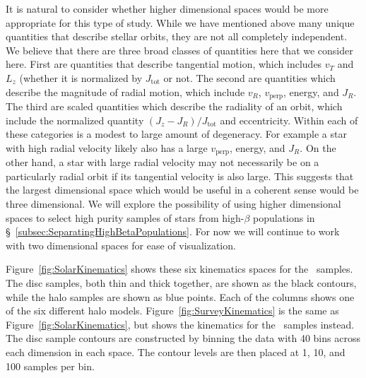 It is natural to consider whether higher dimensional spaces would be more appropriate for this type of study. While we have mentioned above many unique quantities that describe stellar orbits, they are not all completely independent. We believe that there are three broad classes of quantities here that we consider here. First are quantities that describe tangential motion, which includes $v_{T}$ and $L_{z}$ (whether it is normalized by $J_\mathrm{tot}$ or not. The second are quantities which describe the magnitude of radial motion, which include $v_{R}$, $v_\mathrm{perp}$, energy, and $J_{R}$. The third are scaled quantities which describe the radiality of an orbit, which include the normalized quantity $(J_{z}-J_{R})/J_\mathrm{tot}$ and eccentricity. Within each of these categories is a modest to large amount of degeneracy. For example a star with high radial velocity likely also has a large $v_\mathrm{perp}$, energy, and $J_{R}$. On the other hand, a star with large radial velocity may not necessarily be on a particularly radial orbit if its tangential velocity is also large. This suggests that the largest dimensional space which would be useful in a coherent sense would be three dimensional. We will explore the possibility of using higher dimensional spaces to select high purity samples of stars from high-$\beta$ populations in \S~\ref{subsec:SeparatingHighBetaPopulations}. For now we will continue to work with two dimensional spaces for ease of visualization.


Figure~\ref{fig:SolarKinematics} shows these six kinematics spaces for the \solar\ samples. The disc samples, both thin and thick together, are shown as the black contours, while the halo samples are shown as blue points. Each of the columns shows one of the six different halo models. Figure~\ref{fig:SurveyKinematics} is the same as Figure~\ref{fig:SolarKinematics}, but shows the kinematics for the \survey\ samples instead. The disc sample contours are constructed by binning the data with 40 bins across each dimension in each space. The contour levels are then placed at 1, 10, and 100 samples per bin. 

